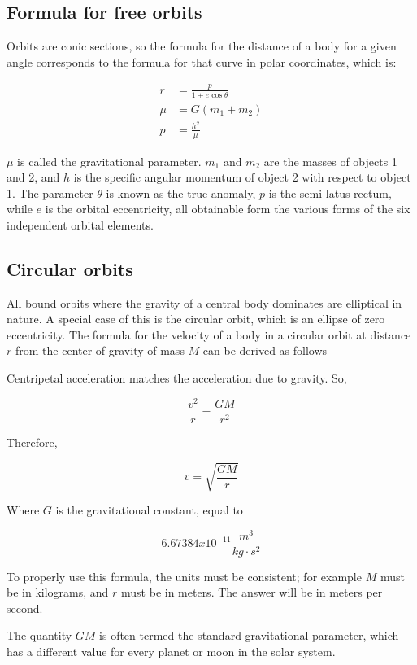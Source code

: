\documentclass[12pt]{article}
\begin{document}
\subsection{Formula for free orbits}

Orbits are conic sections, so the formula for the distance of a body for a
given angle corresponds to the formula for that curve in polar coordinates,
which is:

\begin{align*}
  r &= \frac{p}{1+e\cos\theta} \\
  \mu &= G(m_1+m_2) \\
  p &=\frac{h^2}{\mu}
\end{align*}

\(\mu\) is called the gravitational parameter. \(m_1\) and \(m_2\) are the
masses of objects 1 and 2, and \(h\) is the specific angular momentum of object
2 with respect to object 1. The parameter \(\theta\) is known as the true
anomaly, \(p\) is the semi-latus rectum, while \(e\) is the orbital
eccentricity, all obtainable form the various forms of the six independent
orbital elements.

\subsection{Circular orbits}

All bound orbits where the gravity of a central body dominates are elliptical
in nature. A special case of this is the circular orbit, which is an ellipse of
zero eccentricity. The formula for the velocity of a body in a circular orbit
at distance \(r\) from the center of gravity of mass \(M\) can be derived as
follows -

Centripetal acceleration matches the acceleration due to gravity. So,

\[\frac{v^{2}}{r}=\frac{GM}{r^{2}}\]

Therefore,

\[v=\sqrt{\frac{GM}{r}}\]

Where \(G\) is the gravitational constant, equal to

\[6.67384x10^{-11}\frac{m^{3}}{kg\cdot s^2}\]

To properly use this formula, the units must be consistent; for example \(M\)
must be in kilograms, and \(r\) must be in meters. The answer will be in meters
per second.

The quantity \(GM\) is often termed the standard gravitational parameter, which
has a different value for every planet or moon in the solar system.
\end{document}
